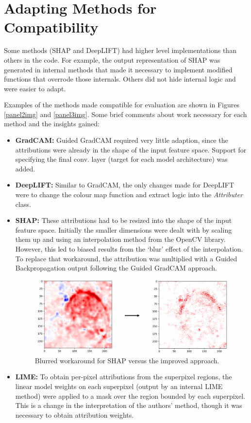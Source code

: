 \documentclass[main]{subfiles}
\begin{document}
\newpage
\section{Adapting Methods for Compatibility}  \label{sec:adaption}

Some methods (SHAP and DeepLIFT) had higher level implementations than others in the code. For example, the output representation of SHAP was generated in internal methods that made it necessary to implement modified functions that overrode those internals. Others did not hide internal logic and were easier to adapt.

Examples of the methods made compatible for evaluation are shown in Figures \ref{panel2img} and \ref{panel3img}. Some brief comments  about work necessary for each method and the insights gained:

\begin{itemize}
\item \textbf{GradCAM:} Guided GradCAM required very little adaption, since the attributions were already in the shape of the input feature space. Support for specifying the final conv. layer (target for each model architecture) was added.
\item \textbf{DeepLIFT:} Similar to GradCAM, the only changes made for DeepLIFT were to change the colour map function and extract logic into the \textit{Attributer} class.
\item \textbf{SHAP:} These attributions had to be resized into the shape of the input feature space. Initially the smaller dimensions were dealt with by scaling them up and using an interpolation method from the OpenCV library. However, this led to biased results from the `blur' effect of the interpolation. To replace that workaround, the attribution was multiplied with a Guided Backpropagation output following the Guided GradCAM approach.
\begin{figure}[htbp]
\centering
\includegraphics[scale=0.3]{shap_change.png}
\caption{Blurred workaround for SHAP versus the improved approach.}
\label{shap_workaround_img}
\end{figure}


\item \textbf{LIME:} To obtain per-pixel attributions from the superpixel regions, the linear model weights on each superpixel (output by an internal LIME method) were applied to a mask over the region bounded by each superpixel. This is a change in the interpretation of the authors' method, though it was necessary to obtain attribution weights.
\end{itemize}
\end{document}
